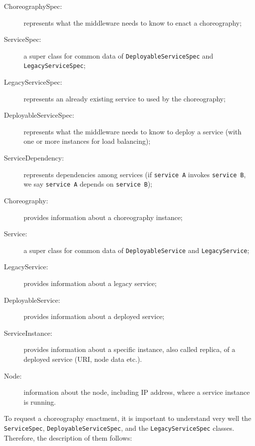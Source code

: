 \documentclass[a4paper, 10pt]{article}
\begin{document}
\begin{description}
\item [ChoreographySpec:] represents what the middleware needs to know to enact a choreography;
\item [ServiceSpec:] a super class for common data of \verb!DeployableServiceSpec! and \verb!LegacyServiceSpec!;
\item [LegacyServiceSpec:] represents an already existing service to used by the choreography;
\item [DeployableServiceSpec:] represents what the middleware needs to know to deploy a service (with one or more instances for load balancing); 
\item [ServiceDependency:] represents dependencies among services (if \verb!service A! invokes \verb!service B!, we say \verb!service A! depends on \verb!service B!);
\item [Choreography:] provides information about a choreography instance;
\item [Service:] a super class for common data of \verb!DeployableService! and \verb!LegacyService!;
\item [LegacyService:] provides information about a legacy service;
\item [DeployableService:] provides information about a deployed service;
\item [ServiceInstance:] provides information about a specific instance, also called replica, of a deployed service (URI, node data etc.). 
\item [Node:] information about the node, including IP address, where a service instance is running.
\end{description}

To request a choreography enactment, it is important to understand very well the \verb!ServiceSpec!, \verb!DeployableServiceSpec!, and the \verb!LegacyServiceSpec! classes. Therefore, the description of them follows:
\end{document}
